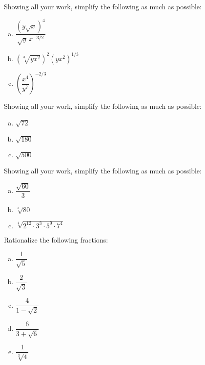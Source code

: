 \documentclass[11pt,letterpaper]{article}
\begin{document}
\newpage



 Showing all your work, simplify the following as much as possible:
        \begin{enumerate}[(a)]
        \item $\dfrac{(y \sqrt{x})^4}{\sqrt{y}\, x^{-3/2}}$
        \item $(\sqrt[3]{y x^2})^2 (yx^2)^{1/3}$
        \item $\left( \dfrac{x^4}{y^7} \right)^{-2/3}$
        \end{enumerate}



\newpage



 Showing all your work, simplify the following as much as possible:
        \begin{enumerate}[(a)]
        \item $\sqrt{72}$
        \item $\sqrt{180}$
        \item $\sqrt{500}$
        \end{enumerate}



\newpage



 Showing all your work, simplify the following as much as possible:
        \begin{enumerate}[(a)]
        \item $\dfrac{\sqrt{60}}{3}$
        \item $\sqrt[3]{80}$
        \item $\sqrt[4]{2^{12} \cdot 3^3 \cdot 5^9 \cdot 7^4}$
        \end{enumerate}



\newpage



 Rationalize the following fractions:
        \begin{enumerate}[(a)]
        \item $\dfrac{1}{\sqrt{5}}$
        \item $\dfrac{2}{\sqrt{3}}$
        \item $\dfrac{4}{1 - \sqrt{2}}$
        \item $\dfrac{6}{3 + \sqrt{6}}$
        \item $\dfrac{1}{\sqrt[3]{4}}$
        \end{enumerate}
\end{document}
